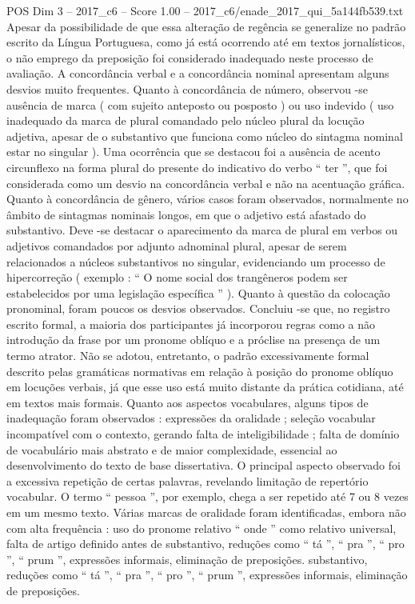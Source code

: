 \begin{textsample}{POS Dim 3 – 2017\_c6 – Score 1.00 – 2017\_c6/enade\_2017\_qui\_5a144fb539.txt}
Apesar da possibilidade de que essa alteração de regência se generalize no padrão escrito da Língua Portuguesa, como já está ocorrendo até em textos jornalísticos, o não emprego da preposição foi considerado inadequado neste processo de avaliação.
A concordância verbal e a concordância nominal apresentam alguns desvios muito frequentes.
Quanto à concordância de número, observou -se ausência de marca ( com sujeito anteposto ou posposto ) ou uso indevido ( uso inadequado da marca de plural comandado pelo núcleo plural da locução adjetiva, apesar de o substantivo que funciona como núcleo do sintagma nominal estar no singular ).
Uma ocorrência que se destacou foi a ausência de acento circunflexo na forma plural do presente do indicativo do verbo “ ter ”, que foi considerada como um desvio na concordância verbal e não na acentuação gráfica.
Quanto à concordância de gênero, vários casos foram observados, normalmente no âmbito de sintagmas nominais longos, em que o adjetivo está afastado do substantivo.
Deve -se destacar o aparecimento da marca de plural em verbos ou adjetivos comandados por adjunto adnominal plural, apesar de serem relacionados a núcleos substantivos no singular, evidenciando um processo de hipercorreção ( exemplo : “ O nome social dos trangêneros podem ser estabelecidos por uma legislação específica ” ).
Quanto à questão da colocação pronominal, foram poucos os desvios observados.
Concluiu -se que, no registro escrito formal, a maioria dos participantes já incorporou regras como a não introdução da frase por um pronome oblíquo e a próclise na presença de um termo atrator.
Não se adotou, entretanto, o padrão excessivamente formal descrito pelas gramáticas normativas em relação à posição do pronome oblíquo em locuções verbais, já que esse uso está muito distante da prática cotidiana, até em textos mais formais.
Quanto aos aspectos vocabulares, alguns tipos de inadequação foram observados : expressões da oralidade ; seleção vocabular incompatível com o contexto, gerando falta de inteligibilidade ; falta de domínio de vocabulário mais abstrato e de maior complexidade, essencial ao desenvolvimento do texto de base dissertativa.
O principal aspecto observado foi a excessiva repetição de certas palavras, revelando limitação de repertório vocabular.
O termo “ pessoa ”, por exemplo, chega a ser repetido até 7 ou 8 vezes em um mesmo texto.
Várias marcas de oralidade foram identificadas, embora não com alta frequência : uso do pronome relativo “ onde ” como relativo universal, falta de artigo definido antes de substantivo, reduções como “ tá ”, “ pra ”, “ pro ”, “ prum ”, expressões informais, eliminação de preposições. substantivo, reduções como “ tá ”, “ pra ”, “ pro ”, “ prum ”, expressões informais, eliminação de preposições.

\end{textsample}
